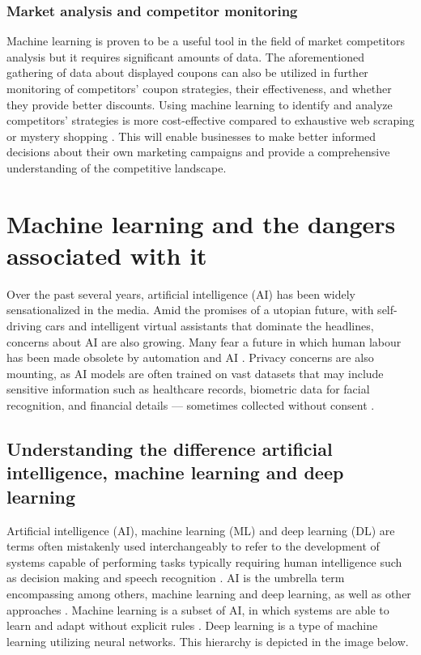 \documentclass[licencjacka,en]{pracamgr}
\begin{document}
\subsection{Market analysis and competitor monitoring}
Machine learning is proven to be a useful tool in the field of market competitors analysis but it requires significant amounts of data\cite{competitor_tariffs}.
The aforementioned gathering of data about displayed coupons can also be utilized in further monitoring of competitors' coupon strategies, their effectiveness, and whether they provide better discounts. Using machine learning to identify and analyze competitors' strategies is more cost-effective compared to exhaustive web scraping or mystery shopping \cite{competitor_tariffs}. This will enable businesses to make better informed decisions about their own marketing campaigns and provide a comprehensive understanding of the competitive landscape.

\chapter{Machine learning and the dangers associated with it}

Over the past several years, artificial intelligence (AI) has been widely sensationalized in the media. Amid the promises of a utopian future, with self-driving cars and intelligent virtual assistants that dominate the headlines, concerns about AI are also growing. Many fear a future in which human labour has been made obsolete by automation and AI \cite{francuz}. Privacy concerns are also mounting, as AI models are often trained on vast datasets that may include sensitive information such as healthcare records, biometric data for facial recognition, and financial details — sometimes collected without consent \cite{ibm_privacy}. 

\section{Understanding the difference artificial intelligence, machine learning and deep learning}
Artificial intelligence (AI), machine learning (ML) and deep learning (DL) are terms often mistakenly used interchangeably to refer to the development of systems capable of performing tasks typically requiring human intelligence such as decision making and speech recognition \cite{ibm_ai}. AI is the umbrella term encompassing among others, machine learning and deep learning, as well as other approaches \cite{francuz}. Machine learning is a subset of AI, in which systems are able to learn and adapt without explicit rules \cite{ibm_ai}. Deep learning is a type of machine learning utilizing neural networks. This hierarchy is depicted in the image below.
\end{document}
